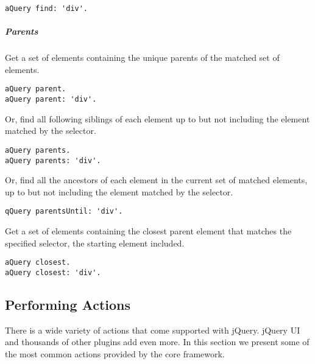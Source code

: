 \documentclass[a4paper,10pt,twoside]{book}
\begin{document}
\begin{lstlisting}
aQuery find: 'div'.
\end{lstlisting}

\subparagraph*{ Parents}
\label{book:web20:jquery:basics:refiningqueries:168289856}
  Get a set of elements containing the unique parents of the matched set of elements.

\begin{lstlisting}
aQuery parent.
aQuery parent: 'div'.
\end{lstlisting}

  Or, find all following siblings of each element up to but not including the element matched by the selector.

\begin{lstlisting}
aQuery parents.
aQuery parents: 'div'.
\end{lstlisting}

 Or, find all the ancestors of each element in the current set of matched elements, up to but not including the element matched by the selector.

\begin{lstlisting}
qQuery parentsUntil: 'div'.
\end{lstlisting}

  Get a set of elements containing the closest parent element that matches the specified selector, the starting element included.

\begin{lstlisting}
aQuery closest.
aQuery closest: 'div'.
\end{lstlisting}

\subsection{Performing Actions}
\label{book:web20:jquery:basics:performingactions}

There is a wide variety of actions that come supported with jQuery. jQuery UI and thousands of other plugins add even more. In this section we present some of the most common actions provided by the core framework.
\end{document}
